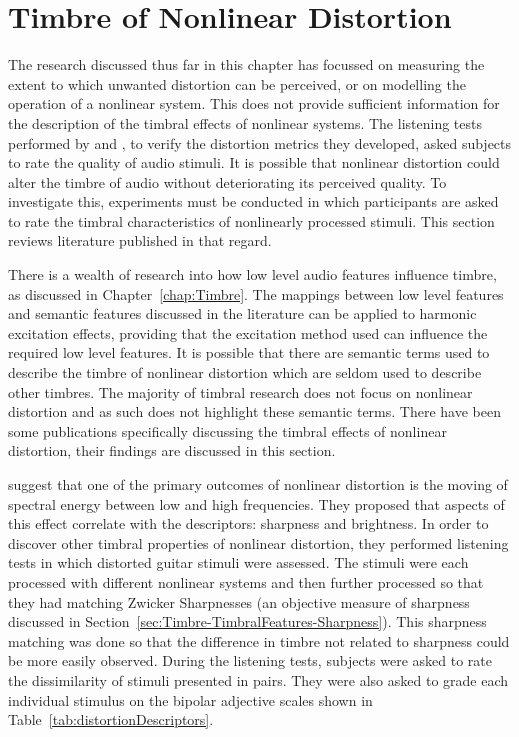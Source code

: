 \section{Timbre of Nonlinear Distortion}
\label{sec:Excitation-Timbre}
	The research discussed thus far in this chapter has focussed on measuring the extent to which unwanted distortion
	can be perceived, or on modelling the operation of a nonlinear system. This does not provide sufficient information
	for the description of the timbral effects of nonlinear systems. The listening tests performed by
	\citet{lee2003auditory} and \citet{tan2004predicting}, to verify the distortion metrics they developed, asked
	subjects to rate the quality of audio stimuli. It is possible that nonlinear distortion could alter the timbre of
	audio without deteriorating its perceived quality. To investigate this, experiments must be conducted in which
	participants are asked to rate the timbral characteristics of nonlinearly processed stimuli. This section reviews
	literature published in that regard.

	There is a wealth of research into how low level audio features influence timbre, as discussed in
	Chapter~\ref{chap:Timbre}. The mappings between low level features and semantic features discussed in the
	literature can be applied to harmonic excitation effects, providing that the excitation method used can influence
	the required low level features.  It is possible that there are semantic terms used to describe the timbre of
	nonlinear distortion which are seldom used to describe other timbres. The majority of timbral research does not
	focus on nonlinear distortion and as such does not highlight these semantic terms. There have been some
	publications specifically discussing the timbral effects of nonlinear distortion, their findings are discussed in
	this section.

	\citet{marui2005predicting} suggest that one of the primary outcomes of nonlinear distortion is the moving of
	spectral energy between low and high frequencies. They proposed that aspects of this effect correlate with the
	descriptors: sharpness and brightness. In order to discover other timbral properties of nonlinear distortion, they
	performed listening tests in which distorted guitar stimuli were assessed. The stimuli were each processed with
	different nonlinear systems and then further processed so that they had matching Zwicker Sharpnesses (an objective
	measure of sharpness \citep{fastl2007psychoacoustics} discussed in
	Section~\ref{sec:Timbre-TimbralFeatures-Sharpness}). This sharpness matching was done so that the difference in
	timbre not related to sharpness could be more easily observed. During the listening tests, subjects were asked to
	rate the dissimilarity of stimuli presented in pairs. They were also asked to grade each individual stimulus on the
	bipolar adjective scales shown in Table~\ref{tab:distortionDescriptors}.


